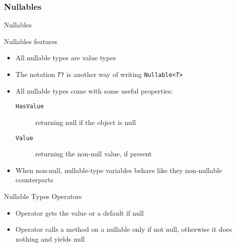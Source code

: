 \documentclass[presentation]{beamer}
\begin{document}
\subsubsection{Nullables}

\begin{frame}[shrink=5]{\dotnet Nullables}
    \begin{block}{Nullables features}
        \begin{itemize}
            \item All nullable types are \alert{value} types

            \item The notation \texttt{\textit{T}?} is another way of writing \texttt{Nullable<\textit{T}>}
            \item All nullable types come with some useful properties:
            \begin{description}
                \item[\texttt{HasValue}] returning null if the object is null
                \item[\texttt{Value}] returning the non-null value, if present
            \end{description}

            \item When non-null, nullable-type variables behave like they non-nullable counterparts
        \end{itemize}
    \end{block}
    
\end{frame}

\begin{frame}{Nullable Types Operators}
    \begin{block}{}
        \begin{itemize}
            \item Operator  gets the value or a default if null

            \item Operator  calls a method on a nullable only if not null, otherwise it does nothing and yields null
        \end{itemize}
    \end{block}

\end{frame}
\end{document}
